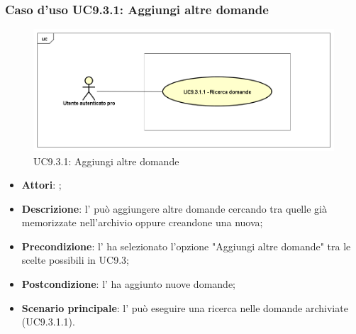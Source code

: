 		 \subsubsection{Caso d'uso UC9.3.1: Aggiungi altre domande}
		 \label{UC9.3.1}
		 \begin{figure}[h]
		 	\centering
		 	\includegraphics[scale=0.5,keepaspectratio]{UML/UC9_3_1.png}
		 	\caption{UC9.3.1: Aggiungi altre domande}
		 \end{figure}
		 \FloatBarrier
		 \begin{itemize}
		 	\item \textbf{Attori}: \uaupro{};
		 	\item \textbf{Descrizione}: l'\uaupro{} può aggiungere altre domande cercando tra quelle già memorizzate nell'archivio oppure creandone una nuova; 
		 	\item \textbf{Precondizione}: l'\uaupro{} ha selezionato l'opzione "Aggiungi altre domande" tra le scelte possibili in UC9.3;
		 	\item \textbf{Postcondizione}: l'\uaupro{} ha aggiunto nuove domande;
		 	\item \textbf{Scenario principale}: l'\uaupro{} può eseguire una ricerca nelle domande archiviate (UC9.3.1.1).
		 \end{itemize}
		 
